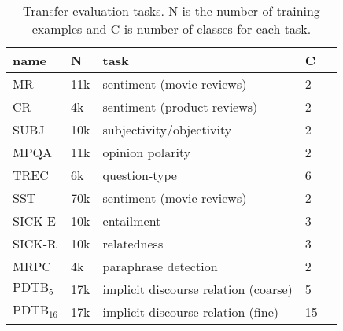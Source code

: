 \documentclass[11pt,a4paper]{article}
\begin{document}
 \begin{table}[htb]
\small
\begin{center}
\begin{tabular}{lllll}
\toprule
   name &     N &                         task &           C              \\
\midrule
     MR &   11k &           sentiment (movie reviews) &           2 &                        \\
     CR &    4k &  sentiment (product reviews) &           2 &                       \\
   SUBJ &   10k &     subjectivity/objectivity &           2 &                         \\
   MPQA &   11k &             opinion polarity &           2 & \\
   TREC &    6k &                question-type &           6 &                     \\
   SST &   70k &                sentiment (movie reviews) &           2 &                        \\
 SICK-E&   10k &             entailment  &           3 &         \\
  SICK-R&   10k &                          relatedness &           3 &             \\
   MRPC &  4k &         paraphrase detection &           2 &   \\
  $\text{PDTB}_5$ &  17k &                 implicit discourse relation (coarse) &  5 &         \\
  $\text{PDTB}_{16}$ &  17k &                 implicit discourse relation (fine) &  15 &         \\

\bottomrule
\end{tabular}
\end{center}
 \caption{Transfer evaluation tasks. N is the number of training examples and C is number of classes for each task.}
\label{table:evaltasks}
 \end{table}
\end{document}
